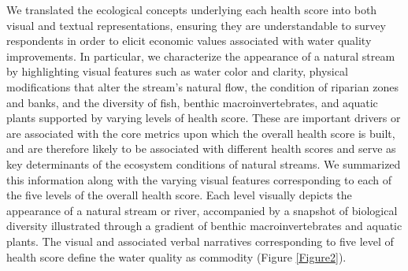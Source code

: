 \documentclass[12pt]{article}
\begin{document}
We translated the ecological concepts underlying each health score into both visual and textual representations, ensuring they 
are understandable to survey respondents in order to elicit economic values associated with water quality improvements. 
In particular, we characterize the appearance of a natural stream by highlighting visual features such as water color and clarity, 
physical modifications that alter the stream’s natural flow, the condition of riparian zones and banks, and the diversity of fish, 
benthic macroinvertebrates, and aquatic plants supported by varying levels of health score. These are important drivers or are 
associated with the core metrics upon which the overall health score is built, and are therefore likely to be associated with 
different health scores and serve as key determinants of the ecosystem conditions of natural streams. We summarized this information 
along with the varying visual features corresponding to each of the five levels of the overall health score. Each level visually 
depicts the appearance of a natural stream or river, accompanied by a snapshot of biological diversity illustrated through a 
gradient of benthic macroinvertebrates and aquatic plants. The visual and associated verbal narratives corresponding to five level 
of health score define the water quality as commodity (Figure \ref{Figure2}).
\end{document}

